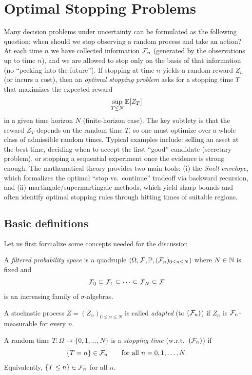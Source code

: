 \chapter{Optimal Stopping Problems}

Many decision problems under uncertainty can be formulated as the following question:
when should we stop observing a random process and take an action?
At each time $n$ we have collected information $\mathcal{F}_n$ (generated by the observations up to time $n$),
and we are allowed to stop only on the basis of that information (no ``peeking into the future'').
If stopping at time $n$ yields a random reward $Z_n$ (or incurs a cost), then an \emph{optimal stopping problem}
asks for a stopping time $T$ that maximizes the expected reward
\[
\sup_{T\le N}\mathbb{E}[Z_T]
\]
in a given time horizon $N$ (finite-horizon case).  The key subtlety is that the reward $Z_T$ depends on the
random time $T$, so one must optimize over a whole class of admissible random times.  Typical examples include:
selling an asset at the best time, deciding when to accept the first ``good'' candidate (secretary problem),
or stopping a sequential experiment once the evidence is strong enough.  The mathematical theory provides
two main tools: (i) the \emph{Snell envelope}, which formalizes the optimal ``stop vs.\ continue'' tradeoff via
backward recursion, and (ii) martingale/supermartingale methods, which yield sharp bounds and often identify
optimal stopping rules through hitting times of suitable regions.

\section{Basic definitions}
Let us first formalize some concepts needed for the discussion

\begin{definition}
A \emph{filtered probability space} is a quadruple $(\Omega,\mathcal{F},\mathbb{P},(\mathcal{F}_n)_{0\le n\le N})$
where $N\in\mathbb{N}$ is fixed and
\[
\mathcal{F}_0 \subseteq \mathcal{F}_1 \subseteq \cdots \subseteq \mathcal{F}_N \subseteq \mathcal{F}
\]
is an increasing family of $\sigma$-algebras.
\end{definition}

\begin{definition}
A stochastic process $Z=(Z_n)_{0\le n\le N}$ is called \emph{adapted} (to $(\mathcal{F}_n)$) if
$Z_n$ is $\mathcal{F}_n$-measurable for every $n$.
\end{definition}

\begin{definition}
A random time $T:\Omega\to\{0,1,\dots,N\}$ is a \emph{stopping time} (w.r.t.\ $(\mathcal{F}_n)$) if
\[
\{T=n\}\in \mathcal{F}_n \qquad \text{for all } n=0,1,\dots,N.
\]
Equivalently, $\{T\le n\}\in\mathcal{F}_n$ for all $n$.
\end{definition}

